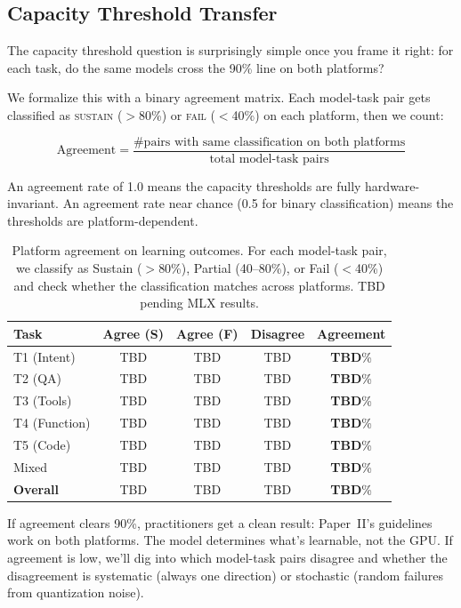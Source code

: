 \documentclass[11pt]{article}
\begin{document}
\subsection{Capacity Threshold Transfer}

The capacity threshold question is surprisingly simple once you frame it right: for each task, do the same models cross the 90\% line on both platforms?

We formalize this with a binary agreement matrix.  Each model-task pair gets classified as \textsc{sustain} ($>$80\%) or \textsc{fail} ($<$40\%) on each platform, then we count:

\begin{equation}
\text{Agreement} = \frac{\text{\# pairs with same classification on both platforms}}{\text{total model-task pairs}}
\end{equation}

An agreement rate of 1.0 means the capacity thresholds are fully hardware-invariant.  An agreement rate near chance (0.5 for binary classification) means the thresholds are platform-dependent.

\begin{table}[t]
\centering
\caption{Platform agreement on learning outcomes.  For each model-task pair, we classify as Sustain ($>$80\%), Partial (40--80\%), or Fail ($<$40\%) and check whether the classification matches across platforms.  TBD pending MLX results.}
\label{tab:agreement}
\begin{tabular}{l ccc c}
\toprule
\textbf{Task} & \textbf{Agree (S)} & \textbf{Agree (F)} & \textbf{Disagree} & \textbf{Agreement} \\
\midrule
T1 (Intent) & TBD & TBD & TBD & \textbf{TBD}\% \\
T2 (QA) & TBD & TBD & TBD & \textbf{TBD}\% \\
T3 (Tools) & TBD & TBD & TBD & \textbf{TBD}\% \\
T4 (Function) & TBD & TBD & TBD & \textbf{TBD}\% \\
T5 (Code) & TBD & TBD & TBD & \textbf{TBD}\% \\
Mixed & TBD & TBD & TBD & \textbf{TBD}\% \\
\midrule
\textbf{Overall} & TBD & TBD & TBD & \textbf{TBD}\% \\
\bottomrule
\end{tabular}
\end{table}

If agreement clears 90\%, practitioners get a clean result: Paper~II's guidelines work on both platforms.  The model determines what's learnable, not the GPU.  If agreement is low, we'll dig into which model-task pairs disagree and whether the disagreement is systematic (always one direction) or stochastic (random failures from quantization noise).
\end{document}
